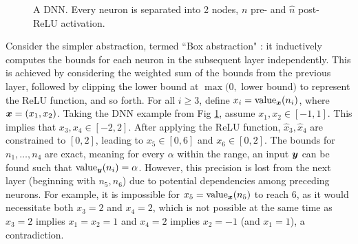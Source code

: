 \begin{figure}[t!]
	\caption{A DNN. Every neuron is separated into 2 nodes, 
	$n$ pre- and $\hat{n}$ post-ReLU activation.} 
	\label{fig1}
\end{figure}




Consider the simpler abstraction, termed ``Box abstraction" \cite{deeppoly}: it inductively computes the bounds for each neuron in the subsequent layer independently. This is achieved by considering the weighted sum of the bounds from the previous layer, followed by clipping the lower bound at $\max(0,$ lower bound$)$ to represent the ReLU function, and so forth. 
For all $i \geq 3$, define $x_i={\textrm{value}}_{{\bm{x}}}(n_i)$, where ${\bm{x}}=(x_1,x_2)$.
Taking the DNN example from Fig \ref{fig1}, assume $x_1,x_2 \in [-1,1]$. This implies that $x_3,x_4 \in [-2,2]$. After applying the ReLU function, $\hat{x}_3,\hat{x}_4$ are constrained to $[0,2]$, leading to $x_5 \in [0,6]$ and $x_6 \in [0,2]$. 
The bounds for $n_1, \ldots, n_4$ are exact, meaning for every $\alpha$ within the range, an input ${\bm{y}}$ can be found such that ${\textrm{value}}_{{\bm{y}}}(n_i)=\alpha$. However, this precision is lost from the next layer (beginning with $n_5, n_6$) due to potential dependencies among preceding neurons. For example, it is impossible for $x_5={\textrm{value}}_{{\bm{x}}}(n_5)$ to reach $6$, as it would necessitate both $x_3=2$ and $x_4=2$, which is not possible at the same time as 
$x_3=2$ implies $x_1=x_2=1$ and $x_4=2$ implies $x_2=-1$ (and $x_1=1$), a contradiction.




